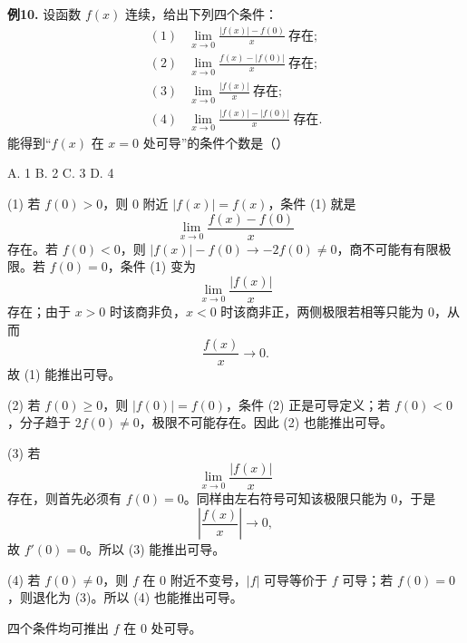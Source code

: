 \begin{problemblock}
\textbf{例10.} 设函数 \(f(x)\) 连续，给出下列四个条件：
\[
\begin{array}{ll}
(1)&\displaystyle \lim_{x\to0}\frac{|f(x)|-f(0)}{x}\ \text{存在};\\[0.8em]
(2)&\displaystyle \lim_{x\to0}\frac{f(x)-|f(0)|}{x}\ \text{存在};\\[0.8em]
(3)&\displaystyle \lim_{x\to0}\frac{|f(x)|}{x}\ \text{存在};\\[0.8em]
(4)&\displaystyle \lim_{x\to0}\frac{|f(x)|-|f(0)|}{x}\ \text{存在}.
\end{array}
\]
能得到“\(f(x)\) 在 \(x=0\) 处可导”的条件个数是（\quad）

A. 1
\quad B. 2
\quad C. 3
\quad D. 4
\end{problemblock}
\begin{solutionblock}
(1) 若 \(f(0)>0\)，则 \(0\) 附近 \(|f(x)|=f(x)\)，条件 (1) 就是
\[
\lim_{x\to0}\frac{f(x)-f(0)}x
\]
存在。若 \(f(0)<0\)，则 \(|f(x)|-f(0)\to -2f(0)\ne0\)，商不可能有有限极限。若 \(f(0)=0\)，条件 (1) 变为
\[
\lim_{x\to0}\frac{|f(x)|}{x}
\]
存在；由于 \(x>0\) 时该商非负，\(x<0\) 时该商非正，两侧极限若相等只能为 \(0\)，从而
\[
\frac{f(x)}x\to0.
\]
故 (1) 能推出可导。

(2) 若 \(f(0)\ge0\)，则 \(|f(0)|=f(0)\)，条件 (2) 正是可导定义；若 \(f(0)<0\)，分子趋于 \(2f(0)\ne0\)，极限不可能存在。因此 (2) 也能推出可导。

(3) 若
\[
\lim_{x\to0}\frac{|f(x)|}{x}
\]
存在，则首先必须有 \(f(0)=0\)。同样由左右符号可知该极限只能为 \(0\)，于是
\[
\left|\frac{f(x)}x\right|\to0,
\]
故 \(f'(0)=0\)。所以 (3) 能推出可导。

(4) 若 \(f(0)\ne0\)，则 \(f\) 在 0 附近不变号，\(|f|\) 可导等价于 \(f\) 可导；若 \(f(0)=0\)，则退化为 (3)。所以 (4) 也能推出可导。

四个条件均可推出 \(f\) 在 \(0\) 处可导。
\end{solutionblock}

